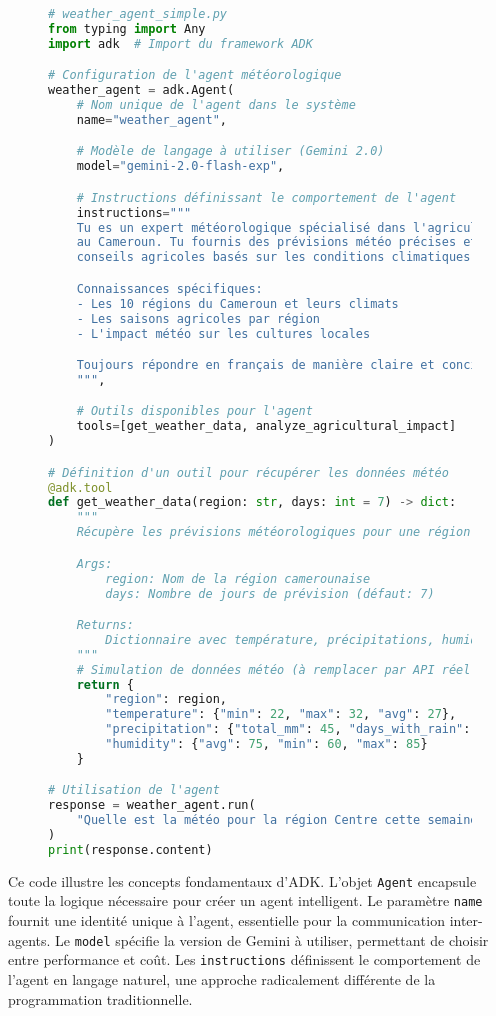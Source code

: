 \begin{figure}[H]
\centering
\begin{lstlisting}[language=Python, caption=Agent météorologique simple avec ADK]
# weather_agent_simple.py
from typing import Any
import adk  # Import du framework ADK

# Configuration de l'agent météorologique
weather_agent = adk.Agent(
    # Nom unique de l'agent dans le système
    name="weather_agent",

    # Modèle de langage à utiliser (Gemini 2.0)
    model="gemini-2.0-flash-exp",

    # Instructions définissant le comportement de l'agent
    instructions="""
    Tu es un expert météorologique spécialisé dans l'agriculture
    au Cameroun. Tu fournis des prévisions météo précises et des
    conseils agricoles basés sur les conditions climatiques.

    Connaissances spécifiques:
    - Les 10 régions du Cameroun et leurs climats
    - Les saisons agricoles par région
    - L'impact météo sur les cultures locales

    Toujours répondre en français de manière claire et concise.
    """,

    # Outils disponibles pour l'agent
    tools=[get_weather_data, analyze_agricultural_impact]
)

# Définition d'un outil pour récupérer les données météo
@adk.tool
def get_weather_data(region: str, days: int = 7) -> dict:
    """
    Récupère les prévisions météorologiques pour une région.

    Args:
        region: Nom de la région camerounaise
        days: Nombre de jours de prévision (défaut: 7)

    Returns:
        Dictionnaire avec température, précipitations, humidité
    """
    # Simulation de données météo (à remplacer par API réelle)
    return {
        "region": region,
        "temperature": {"min": 22, "max": 32, "avg": 27},
        "precipitation": {"total_mm": 45, "days_with_rain": 3},
        "humidity": {"avg": 75, "min": 60, "max": 85}
    }

# Utilisation de l'agent
response = weather_agent.run(
    "Quelle est la météo pour la région Centre cette semaine?"
)
print(response.content)
\end{lstlisting}
\end{figure}

Ce code illustre les concepts fondamentaux d'ADK. L'objet \texttt{Agent} encapsule toute la logique nécessaire pour créer un agent intelligent. Le paramètre \texttt{name} fournit une identité unique à l'agent, essentielle pour la communication inter-agents. Le \texttt{model} spécifie la version de Gemini à utiliser, permettant de choisir entre performance et coût. Les \texttt{instructions} définissent le comportement de l'agent en langage naturel, une approche radicalement différente de la programmation traditionnelle.

